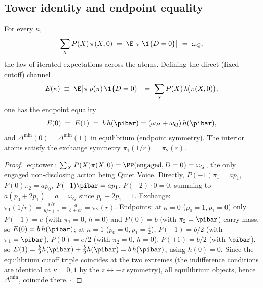 \subsection*{Tower identity and endpoint equality}

\begin{lemma}
\label{lem:tower}
For every $\kappa$,
\begin{equation}
  \sum_{X} P(X)\,\pi(X,0)\;=\;\E\big[\pi\,\1\{D=0\}\big]\;=\;\omega_Q,
  \label{eq:tower}
\end{equation}
the law of iterated expectations across the atoms. Defining the direct
(fixed-cutoff) channel
\begin{equation}
  E(\kappa)\;\equiv\;\E\big[\pi\,p(\pi)\,\1\{D=0\}\big]
  \;=\;\sum_{X} P(X)\,h\!\big(\pi(X,0)\big),
  \label{eq:E-def}
\end{equation}
one has the endpoint equality
\begin{equation}
  E(0)\;=\;E(1)\;=\;b\,h(\pibar)=(\omega_H+\omega_Q)\,h(\pibar),
  \label{eq:endpoint-eq}
\end{equation}
and $\Delta^{\min}(0)=\Delta^{\min}(1)$ in equilibrium (endpoint symmetry).
The interior atoms satisfy the exchange symmetry $\pi_1(1/r)=\pi_2(r)$.
\end{lemma}

\begin{proof}
\eqref{eq:tower}: $\sum_X P(X)\pi(X,0)=\PP(\text{engaged},D=0)=\omega_Q$, the
only engaged non-disclosing action being Quiet Voice. Directly,
$P(-1)\pi_1=a p_1$, $P(0)\pi_2=a p_0$, $P(+1)\pibar=a p_1$, $P(-2)\cdot0=0$,
summing to $a(p_0+2p_1)=a=\omega_Q$ since $p_0+2p_1=1$. Exchange:
$\pi_1(1/r)=\frac{a/r}{b/r+e}=\frac{a}{b+er}=\pi_2(r)$. Endpoints: at
$\kappa=0$ ($p_0=1,p_1=0$) only $P(-1)=e$ (with $\pi_1=0$, $h=0$) and
$P(0)=b$ (with $\pi_2=\pibar$) carry mass, so $E(0)=b\,h(\pibar)$; at
$\kappa=1$ ($p_0=0,p_1=\tfrac12$), $P(-1)=b/2$ (with $\pi_1=\pibar$),
$P(0)=e/2$ (with $\pi_2=0$, $h=0$), $P(+1)=b/2$ (with $\pibar$), so
$E(1)=\tfrac b2 h(\pibar)+\tfrac b2 h(\pibar)=b\,h(\pibar)$, using $h(0)=0$.
Since the equilibrium cutoff triple coincides at the two extremes (the
indifference conditions are identical at $\kappa=0,1$ by the
$z\leftrightarrow-z$ symmetry), all equilibrium objects, hence
$\Delta^{\min}$, coincide there. \hfill$\square$
\end{proof}

